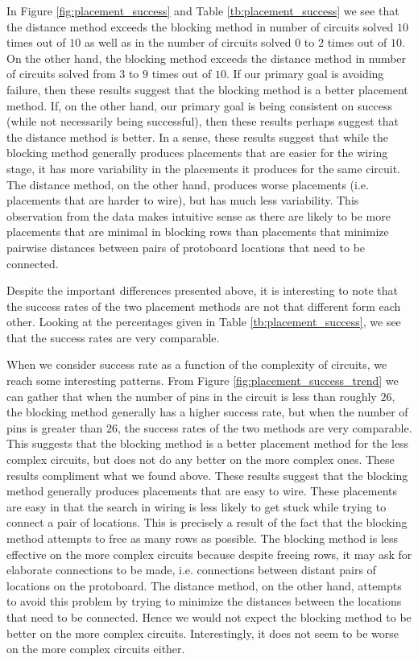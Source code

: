 In Figure \ref{fig:placement_success} and Table \ref{tb:placement_success} we
see that the distance method exceeds the blocking method in number of circuits
solved $10$ times out of $10$ as well as in the number of circuits solved $0$
to $2$ times out of $10$. On the other hand, the blocking method exceeds the
distance method in number of circuits solved from $3$ to $9$ times out
of $10$. If our primary goal is avoiding failure, then these results suggest
that the blocking method is a better placement method. If, on the other hand,
our primary goal is being consistent on success (while not necessarily being
successful), then these results perhaps suggest that the distance method is
better. In a sense, these results suggest that while the blocking method
generally produces placements that are easier for the wiring stage, it has more
variability in the placements it produces for the same circuit. The distance
method, on the other hand, produces worse placements (i.e. placements that are
harder to wire), but has much less variability. This observation from the data
makes intuitive sense as there are likely to be more placements that are minimal
in blocking rows than placements that minimize pairwise distances between pairs
of protoboard locations that need to be connected.

Despite the important differences presented above, it is interesting to note
that the
success rates of the two placement methods are not that different form each
other. Looking at the percentages given in Table \ref{tb:placement_success}, we
see that the success rates are very comparable.

When we consider success rate as a function of the complexity of circuits, we
reach some interesting patterns. From Figure \ref{fig:placement_success_trend} we
can gather that when the number of pins in the circuit is less than roughly $26$,
the blocking method generally has a higher success rate, but when the number of
pins is greater than $26$, the success rates of the two methods are very
comparable. This suggests that the blocking method is a better placement method
for the less complex circuits, but does not do any better on the more
complex ones. These results compliment what we found above. These results
suggest that the blocking method generally produces placements that are easy to
wire. These placements are easy in that the search in wiring is less likely to
get stuck while trying to connect a pair of locations. This is precisely a result
of the fact that the blocking method attempts to free as many rows as possible.
The blocking method is less effective on the more complex circuits because
despite freeing rows, it may ask for elaborate connections to be made, i.e.
connections between distant pairs of locations on the protoboard. The distance
method, on the other hand, attempts to avoid this problem by trying to minimize
the distances between the locations that need to be connected. Hence we would
not expect the blocking method to be better on the more complex circuits.
Interestingly, it does not seem to be worse on the more complex circuits either.

